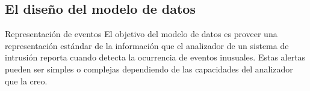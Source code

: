 \subsection{El diseño del modelo de datos}
Representación de eventos
El objetivo del modelo de datos es proveer una representación estándar de la 
información que el analizador de un sistema de intrusión reporta cuando detecta 
la ocurrencia de eventos inusuales. Estas alertas pueden ser simples o complejas 
dependiendo de las capacidades del analizador que la creo.

